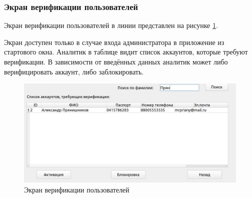 \subsubsection{Экран верификации пользователей}
Экран верификации пользователей в линии представлен на рисунке \ref{fig::verify}.

Экран доступен только в случае входа администратора в приложение из стартового окна.
Аналитик в таблице видит список аккаунтов, которые требуют верификации.
В зависимости от введённых данных аналитик может либо верифицировать аккаунт, либо заблокировать.

\FloatBarrier
\begin{figure}[h]	
	\begin{center}
		\includegraphics[width=\linewidth]{inc/verify.png}
	\end{center}
	\caption{Экран верификации пользователей}
	\label{fig::verify}
\end{figure}
\FloatBarrier